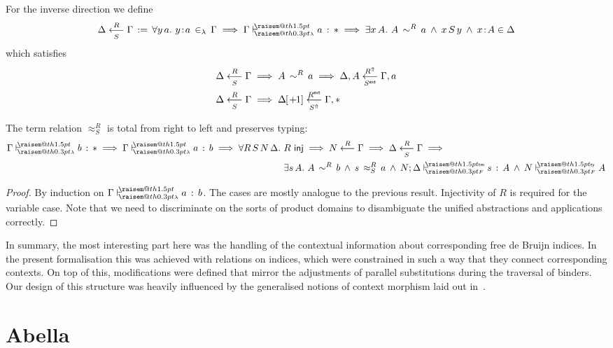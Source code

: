 \documentclass[a4paper,UKenglish]{lipics-v2016}
\makeatletter
\newcommand{\ms}{\,}
\newcommand{\mrel}[1]{\mathrel{\ms #1 \ms}}
\newcommand{\OF}{\mrel{:}}
\newcommand{\mAnd}{\mrel{\wedge}}
\newcommand{\mAll}[1]{\ensuremath{\forall} #1.\ms\ms}
\newcommand{\mEx}[1]{\ensuremath{\exists} #1.\ms\ms}
\newcommand{\eqdef}{\mrel{:=}}
\newcommand{\ty}{\mathsf{ty}}
\newcommand{\tm}{\mathsf{tm}}
\newcommand{\of}{\ensuremath{\!:\!}}
\newcommand{\cc}[2]{#1;#2} %
\newcommand{\raisemath}[1]{\mathpalette{\raisem@th{#1}}}
\newcommand{\raisem@th}[3]{\raisebox{#1}{\ensuremath{#2#3}}}
\newcommand{\tsAnnot}[2]{\vdash\hspace{-.7em}^{\raisemath{1.5pt}{\scriptscriptstyle{#2}}}_{\raisemath{0.3pt}{\scriptscriptstyle{#1}}}} %
\newcommand{\tfF}{\tsAnnot{F}{\ty}}  %
\newcommand{\tyF}{\tsAnnot{F}{\tm}}  %
\newcommand{\istyF}[2]{\ensuremath{{#1} \mathrel{\tfF} #2}}
\newcommand{\typingF}[3]{\ensuremath{{#1} \mathrel{\tyF} #2 \OF #3}}
\newcommand{\tyL}{\tsAnnot{\lambda}{}} %
\newcommand{\typingL}[3]{\ensuremath{{#1} \mathrel{\tyL} #2 \OF #3}}
\newcommand{\inL}{\mrel{\in_{\lambda}}}
\newcommand{\tyr}{\mathrel{\sim}}
\newcommand{\tmr}{\mathrel{\approx}}
\newcommand{\Rext}[1]{\ensuremath{#1^{\mathsf{ext}}}}
\newcommand{\Rshift}[1]{\ensuremath{#1^{\Uparrow}}}
\newcommand{\tyctxrelLF}[3]{\ensuremath{#1\mathrel{\mathop{\longleftarrow}^{#2}\limits}#3}}
\newcommand{\tmctxrelLF}[4]{\ensuremath{#1\mathrel{\mathop{\longleftarrow}^{#2}_{#3}\limits}#4}}
\newcommand{\Prp}{\ensuremath{\textrm{\textasteriskcentered}}}
\newcommand{\subst}[1]{\hphantom{|}\!\![{#1}]}
\newcommand{\shift}{\ensuremath{\hspace{0.1em}\mathsf{+}\hspace{0.08em}\!1}}
\makeatother
\begin{document}
For the inverse direction we define
\begin{align*}
  \tmctxrelLF{\Delta}{R}{S}{\Gamma} \eqdef \mAll{y\,a} y \of a \inL \Gamma \implies \typingL{\Gamma}{a}{\Prp} \implies \mEx{x\,A} A\,\tyr^R\,a \mAnd x\,S\,y \mAnd x \of A \in \Delta
\end{align*}
which satisfies
\begin{align*}
  &\tmctxrelLF{\Delta}{R}{S}{\Gamma} \implies A\,\tyr^R\,a \implies \tmctxrelLF{\Delta,A}{\Rshift{R}}{\Rext{S}}{\Gamma,a}\\
  &\tmctxrelLF{\Delta}{R}{S}{\Gamma} \implies \tmctxrelLF{\Delta\subst{\shift}}{\Rext{R}}{\Rshift{S}}{\Gamma,\Prp}
\end{align*}
\begin{lemma}
  The term relation $\tmr^R_S$ is total from right to left and preserves typing:
  \begin{align*}
    \typingL{\Gamma}{b}{\Prp} \implies \typingL{\Gamma}{a}{b} \implies \mAll{R\,S\,N\,\Delta} &R\ms\ms\mathsf{inj} \implies \tyctxrelLF{N}{R}{\Gamma} \implies \tmctxrelLF{\Delta}{R}{S}{\Gamma} \implies \\
                                                                &\mEx{s\,A} A\,\tyr^R\,b \mAnd s\,\tmr^R_S\,a \mAnd \typingF{\cc{N}{\Delta}}{s}{A} \mAnd \istyF{N}{A}
  \end{align*}
\end{lemma}
\begin{proof}
  By induction on $\typingL{\Gamma}{a}{b}$.
  The cases are mostly analogue to the previous result.
  Injectivity of $R$ is required for the variable case.
  Note that we need to discriminate on the sorts of product domains to disambiguate the unified abstractions and applications correctly.
\end{proof}

In summary, the most interesting part here was the handling of the contextual information about corresponding free de Bruijn indices.
In the present formalisation this was achieved with relations on indices, which were constrained in such a way that they connect corresponding contexts.
On top of this, modifications were defined that mirror the adjustments of parallel substitutions during the traversal of binders.
Our design of this structure was heavily influenced by the generalised notions of context morphism laid out in~\cite{KaiserEtAl:2017:sysf_pts_equiv_coq}.

\section{Abella}
\label{sec:abella}
\end{document}
